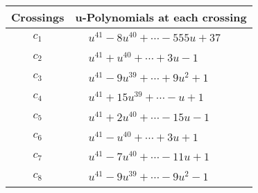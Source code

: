 \documentclass[1p]{elsarticle_modified}
\theoremstyle{definition}
\begin{document}
\begin{tabular}{m{50pt}|m{274pt}}
Crossings & \hspace{64pt}u-Polynomials at each crossing \\
\hline $$\begin{aligned}c_{1}\end{aligned}$$&$\begin{aligned}
&u^{41}-8 u^{40}+\cdots-555 u+37
\end{aligned}$\\
\hline $$\begin{aligned}c_{2}\end{aligned}$$&$\begin{aligned}
&u^{41}+u^{40}+\cdots+3 u-1
\end{aligned}$\\
\hline $$\begin{aligned}c_{3}\end{aligned}$$&$\begin{aligned}
&u^{41}-9 u^{39}+\cdots+9 u^2+1
\end{aligned}$\\
\hline $$\begin{aligned}c_{4}\end{aligned}$$&$\begin{aligned}
&u^{41}+15 u^{39}+\cdots- u+1
\end{aligned}$\\
\hline $$\begin{aligned}c_{5}\end{aligned}$$&$\begin{aligned}
&u^{41}+2 u^{40}+\cdots-15 u-1
\end{aligned}$\\
\hline $$\begin{aligned}c_{6}\end{aligned}$$&$\begin{aligned}
&u^{41}- u^{40}+\cdots+3 u+1
\end{aligned}$\\
\hline $$\begin{aligned}c_{7}\end{aligned}$$&$\begin{aligned}
&u^{41}-7 u^{40}+\cdots-11 u+1
\end{aligned}$\\
\hline $$\begin{aligned}c_{8}\end{aligned}$$&$\begin{aligned}
&u^{41}-9 u^{39}+\cdots-9 u^2-1
\end{aligned}$\\

\end{tabular}
\end{document}
